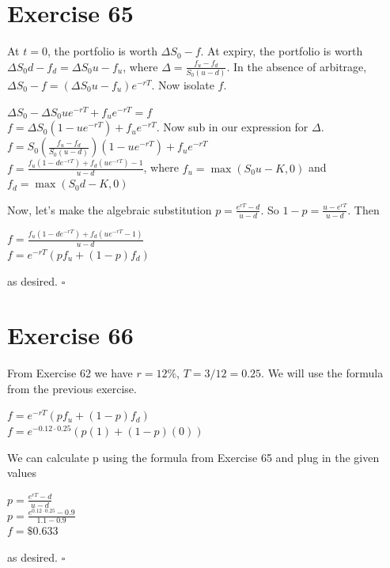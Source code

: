 \documentclass{article}
\begin{document}
\section*{Exercise 65}
\begin{flushleft}
    At $t=0$, the portfolio is worth $\Delta S_0 - f$. At expiry, the portfolio is worth $\Delta S_0d - f_d = \Delta S_0u - f_u$, where $\Delta = \frac{f_u - f_d}{S_0(u-d)}$.
    In the absence of arbitrage, $\Delta S_0 - f = (\Delta S_0u - f_u)e^{-rT}$. Now isolate $f$.
    \begin{center}
        $\Delta S_0 - \Delta S_0ue^{-rT} + f_ue^{-rT} = f$ \\
        $f = \Delta S_0 (1-ue^{-rT}) + f_ue^{-rT}$. Now sub in our expression for $\Delta$. \\
        $f = S_0 \left( \frac{f_u - f_d}{S_0(u-d)} \right) (1-ue^{-rT}) + f_ue^{-rT}$ \\
        $f = \frac{f_u (1-de^{-rT}) + f_d(ue^{-rT}) - 1}{u-d}$, where $f_u = \max(S_0u-K, 0)$ and $f_d = \max(S_0d-K, 0)$
    \end{center}
    Now, let's make the algebraic substitution $p = \frac{e^{rT} - d}{u-d}$. So $1 - p = \frac{u-e^{rT}}{u-d}$. Then
    \begin{center}
        $f = \frac{f_u (1 - de^{-rT}) + f_d(ue^{-rT} - 1)}{u-d}$ \\
        $f = e^{-rT}(pf_u + (1-p)f_d)$
    \end{center}
    as desired. $\square$
\end{flushleft}

\section*{Exercise 66}
From Exercise 62 we have $r = 12\%$, $T = 3/12 = 0.25$. We will use the formula from the previous exercise. 
\begin{center}
    $f = e^{-rT} (pf_u + (1-p)f_d)$ \\
    $f = e^{-0.12 \cdot 0.25} (p(1) + (1-p)(0))$ \\
\end{center}
We can calculate p using the formula from Exercise 65 and plug in the given values
\begin{center}
    $p = \frac{e^{rT} - d}{u-d}$ \\
    $p = \frac{e^{0.12 \cdot 0.25} - 0.9}{1.1-0.9}$ \\
    $f = \$0.633$
\end{center}
as desired. $\square$
\end{document}
